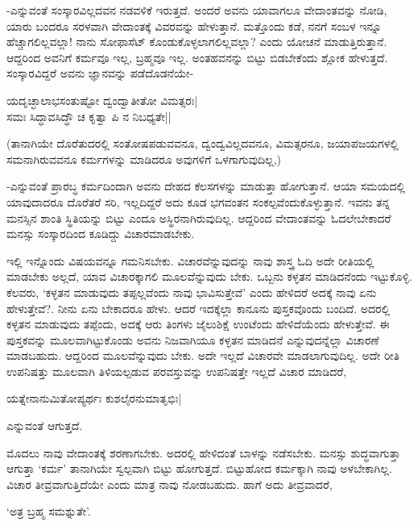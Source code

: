 -ಎನ್ನುವಂತೆ ಸಂಸ್ಕಾರವಿಲ್ಲದವನ ನಡವಳಿಕೆ ಇರುತ್ತದೆ. ಅಂದರೆ ಅವನು ಯಾವಾಗಲೂ ವೇದಾಂತವನ್ನು ನೋಡಿ, ಯಾರು ಬಂದರೂ ಸರಳವಾಗಿ ವೇದಾಂತಕ್ಕೆ ವಿವರವನ್ನು ಹೇಳುತ್ತಾನೆ. ಮತ್ತೊಂದು ಕಡೆ, ನನಗೆ ಸಂಬಳ ಇನ್ನೂ ಹೆಚ್ಚಾಗಲಿಲ್ಲವಲ್ಲಾ! ನಾನು ಸೋಫಾಸೆಟ್ ಕೊಂಡುಕೊಳ್ಳಲಾಗಲಿಲ್ಲವಲ್ಲಾ? ಎಂದು ಯೋಚನೆ ಮಾಡುತ್ತಿರುತ್ತಾನೆ. ಆದ್ದರಿಂದ ಅವನಿಗೆ ಕರ್ಮವೂ ಇಲ್ಲ, ಬ್ರಹ್ಮವೂ ಇಲ್ಲ. ಅಂತಹವನನ್ನು ಬಿಟ್ಟು ಬಿಡಬೇಕೆಂದು ಶ್ಲೋಕ ಹೇಳುತ್ತದೆ. ಸಂಸ್ಕಾರವಿದ್ದರೆ ಅವನು ಜ್ಞಾನವನ್ನು ಪಡೆದೊಡನೆಯೇ-

\begin{shloka}
ಯದೃಚ್ಛಾಲಾಭಸಂತುಷ್ಟೋ ದ್ವಂದ್ವಾತೀತೋ ವಿಮತ್ಸರಃ|\\
ಸಮಃ ಸಿದ್ಧಾವಸಿದ್ಧೌ ಚ ಕೃತ್ವಾ ಪಿ ನ ನಿಬಧ್ಯತೇ||
\end{shloka}

(ತಾನಾಗಿಯೇ ದೊರೆತುದರಲ್ಲಿ ಸಂತೋಷಪಡುವವನೂ, ದ್ವಂದ್ವವಿಲ್ಲದವನೂ, ವಿಮತ್ಸರನೂ, ಜಯಾಪಜಯಗಳಲ್ಲಿ ಸಮನಾಗಿರುವವನೂ ಕರ್ಮಗಳನ್ನು ಮಾಡಿದರೂ ಅವುಗಳಿಗೆ ಒಳಗಾಗುವುದಿಲ್ಲ,)

-ಎನ್ನುವಂತೆ ಪ್ರಾರಬ್ಧ ಕರ್ಮದಿಂದಾಗಿ ಅವನು ದೇಹದ ಕೆಲಸಗಳನ್ನು ಮಾಡುತ್ತಾ ಹೋಗುತ್ತಾನೆ. ಆಯಾ ಸಮಯದಲ್ಲಿ ಯಾವುದಾದರೂ ದೊರೆತರೆ ಸರಿ, ಇಲ್ಲದಿದ್ದರೆ ಅದು ಕೂಡ ಭಗವಂತನ ಸಂಕಲ್ಪವೆಂದುಕೊಳ್ಳುತ್ತಾನೆ. ಇವನು ತನ್ನ ಮನಸ್ಸಿನ ಶಾಂತಿ ಸ್ಥಿತಿಯನ್ನು ಬಿಟ್ಟು ಎಂದೂ ಅಸ್ಥಿರನಾಗಿರುವುದಿಲ್ಲ. ಆದ್ದರಿಂದ ವೇದಾಂತವನ್ನು ಓದಲೇಬೇಕಾದರೆ ಮನಸ್ಸು ಸಂಸ್ಕಾರದಿಂದ ಕೂಡಿದ್ದು ವಿಚಾರಮಾಡಬೇಕು.

ಇಲ್ಲಿ ಇನ್ನೊಂದು ವಿಷಯವನ್ನೂ ಗಮನಿಸಬೇಕು. ವಿಚಾರವೆನ್ನುವುದನ್ನು ನಾವು ಶಾಸ್ತ್ರ ಓದಿ ಅದೇ ರೀತಿಯಲ್ಲಿ ಮಾಡಬೇಕು ಅಲ್ಲದೆ, ಯಾವ ವಿಚಾರಕ್ಕಾಗಲಿ ಮೂಲವೆನ್ನುವುದು ಬೇಕು. ಒಬ್ಬನು ಕಳ್ಳತನ ಮಾಡಿದನೆಂದು ಇಟ್ಟುಕೊಳ್ಳಿ. ಕೆಲವರು, `ಕಳ್ಳತನ ಮಾಡುವುದು ತಪ್ಪಲ್ಲವೆಂದು ನಾವು ಭಾವಿಸುತ್ತೇವೆ' ಎಂದು ಹೇಳಿದರೆ ಅದಕ್ಕೆ ನಾವು ಏನು ಹೇಳುತ್ತೇವೆ?. ನೀನು ಏನು ಬೇಕಾದರೂ ಹೇಳು. ಆದರೆ ಇದಕ್ಕೆಲ್ಲಾ ಕಾನೂನು ಪುಸ್ತಕವೊಂದು ಬಂದಿದೆ. ಅದರಲ್ಲಿ ಕಳ್ಳತನ ಮಾಡುವುದು ತಪ್ಪೆಂದು, ಅದಕ್ಕೆ ಆರು ತಿಂಗಳು ಜೈಲುಶಿಕ್ಷೆ ಉಂಟೆಂದು ಹೇಳಿದೆಯೆಂದು ಹೇಳುತ್ತೇವೆ. ಈ ಪುಸ್ತಕವನ್ನು ಮೂಲವಾಗಿಟ್ಟುಕೊಂಡು ಅವನು ನಿಜವಾಗಿಯೂ ಕಳ್ಳತನ ಮಾಡಿದನೆ ಎನ್ನುವುದನ್ನೆಲ್ಲಾ ವಿಚಾರಣೆ ಮಾಡಬಹುದು. ಆದ್ದರಿಂದ ಮೂಲವೆನ್ನುವುದು ಬೇಕು. ಅದೇ ಇಲ್ಲದೆ ವಿಚಾರವೇ ಮಾಡಲಾಗುವುದಿಲ್ಲ. ಅದೇ ರೀತಿ ಉಪನಿಷತ್ತು ಮೂಲವಾಗಿ ತಿಳಿಯಲ್ಪಡುವ ಪರವಸ್ತುವನ್ನು ಉಪನಿಷತ್ತೇ ಇಲ್ಲದೆ ವಿಚಾರ ಮಾಡಿದರೆ,

\begin{shloka}
ಯತ್ನೇನಾನುಮಿತೋಪ್ಯರ್ಥಃ ಕುಶಲೈರನುಮಾತೃಭಿಃ|
\end{shloka}

ಎನ್ನುವಂತೆ ಆಗುತ್ತದೆ.

ಮೊದಲು ನಾವು ವೇದಾಂತಕ್ಕೆ ಶರಣಾಗಬೇಕು. ಅದರಲ್ಲಿ ಹೇಳಿದಂತೆ ಬಾಳನ್ನು ನಡೆಸಬೇಕು. ಮನಸ್ಸು ಶುದ್ಧವಾಗುತ್ತಾ ಆಗುತ್ತಾ `ಕರ್ಮ' ತಾನಾಗಿಯೇ ಸ್ವಲ್ಪವಾಗಿ ಬಿಟ್ಟು ಹೋಗುತ್ತದೆ. ಬಿಟ್ಟುಹೋದ ಕರ್ಮಕ್ಕಾಗಿ ನಾವು ಅಳಬೇಕಾಗಿಲ್ಲ. ವಿಚಾರ ತೀವ್ರವಾಗುತ್ತಿದೆಯೇ ಎಂದು ಮಾತ್ರ ನಾವು ನೋಡಬಹುದು. ಹಾಗೆ ಅದು ತೀವ್ರವಾದರೆ,

\begin{shloka}
`ಅತ್ರ ಬ್ರಹ್ಮ ಸಮಶ್ನುತೇ'.
\end{shloka}

